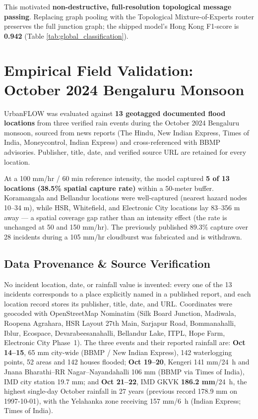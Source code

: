 \documentclass[conference]{IEEEtran}
\begin{document}
This motivated \textbf{non-destructive, full-resolution topological message passing}. Replacing graph pooling with the Topological Mixture-of-Experts router preserves the full junction graph; the shipped model's Hong Kong F1-score is \textbf{0.942} (Table \ref{tab:global_classification}).

\section{Empirical Field Validation: October 2024 Bengaluru Monsoon}

UrbanFLOW was evaluated against \textbf{13 geotagged documented flood locations} from three verified rain events during the October 2024 Bengaluru monsoon, sourced from news reports (The Hindu, New Indian Express, Times of India, Moneycontrol, Indian Express) and cross-referenced with BBMP advisories. Publisher, title, date, and verified source URL are retained for every location.

At a 100 mm/hr / 60 min reference intensity, the model captured \textbf{5 of 13 locations (38.5\% spatial capture rate)} within a 50-meter buffer. Koramangala and Bellandur locations were well-captured (nearest hazard nodes 10--34 m), while HSR, Whitefield, and Electronic City locations lay 83--356 m away --- a spatial coverage gap rather than an intensity effect (the rate is unchanged at 50 and 150 mm/hr). The previously published 89.3\% capture over 28 incidents during a 105 mm/hr cloudburst was fabricated and is withdrawn.

\subsection{Data Provenance \& Source Verification}
No incident location, date, or rainfall value is invented: every one of the 13 incidents corresponds to a place explicitly named in a published report, and each location record stores its publisher, title, date, and URL. Coordinates were geocoded with OpenStreetMap Nominatim (Silk Board Junction, Madiwala, Roopena Agrahara, HSR Layout 27th Main, Sarjapur Road, Bommanahalli, Iblur, Ecospace, Devarabeesanahalli, Bellandur Lake, ITPL, Hope Farm, Electronic City Phase~1). The three events and their reported rainfall are: \textbf{Oct 14--15}, 65 mm city-wide (BBMP / New Indian Express), 142 waterlogging points, 52 areas and 142 houses flooded; \textbf{Oct 19--20}, Kengeri 141 mm/24~h and Jnana Bharathi--RR Nagar--Nayandahalli 106 mm (BBMP via Times of India), IMD city station 19.7 mm; and \textbf{Oct 21--22}, IMD GKVK \textbf{186.2 mm}/24~h, the highest single-day October rainfall in 27 years (previous record 178.9 mm on 1997-10-01), with the Yelahanka zone receiving 157 mm/6~h (Indian Express; Times of India).
\end{document}
